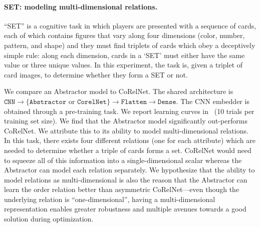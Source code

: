 \paragraph{SET: modeling multi-dimensional relations.}
``SET'' is a cognitive task in which 
players are presented with a sequence of cards, each of which contains figures that vary along four dimensions (color, number, pattern, and shape) and they must find triplets of cards which obey a deceptively simple rule: along each dimension, cards in a `SET' must either have the same value or three unique values. %
In this experiment, the task is, given a triplet of card images, to determine whether they form a SET or not.

We compare an Abstractor model to CoRelNet. The shared architecture is $\texttt{CNN} \to \{\texttt{Abstractor} \text{ or } \texttt{CorelNet}\} \to \texttt{Flatten} \to \texttt{Dense}$. The CNN embedder is obtained through a pre-training task. We report learning curves in~ (10 trials per training set size). We find that the Abstractor model significantly out-performs CoRelNet. We attribute this to its ability to model multi-dimensional relations. In this task, there exists four different relations (one for each attribute) which are needed to determine whether a triple of cards forms a set. CoRelNet would need to squeeze all of this information into a single-dimensional scalar whereas the Abstractor can model each relation separately. We hypothesize that the ability to model relations as multi-dimensional is also the reason that the Abstractor can learn the order relation better than asymmetric CoRelNet---even though the underlying relation is ``one-dimensional'', having a multi-dimensional representation enables greater robustness and multiple avenues towards a good solution during optimization.

